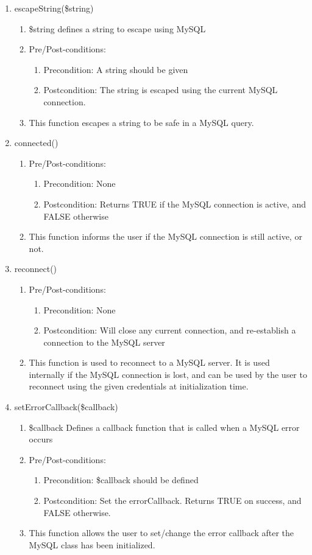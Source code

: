 \documentclass{article}
\begin{document}
\begin{enumerate}
\begin{enumerate}
\end{enumerate}
\item escapeString(\$string)
\begin{enumerate}
\item \$string defines a string to escape using MySQL
\item Pre/Post-conditions:
\begin{enumerate}
\item Precondition: A string should be given
\item Postcondition: The string is escaped using the current MySQL connection.
\end{enumerate}
\item This function escapes a string to be safe in a MySQL query.
\end{enumerate}
\item connected()
\begin{enumerate}
\item Pre/Post-conditions:
\begin{enumerate}
\item Precondition: None
\item Postcondition: Returns TRUE if the MySQL connection is active, and FALSE otherwise
\end{enumerate}
\item This function informs the user if the MySQL connection is still active, or not.
\end{enumerate}
\item reconnect()
\begin{enumerate}
\item Pre/Post-conditions:
\begin{enumerate}
\item Precondition: None
\item Postcondition: Will close any current connection, and re-establish a connection to the MySQL server
\end{enumerate}
\item This function is used to reconnect to a MySQL server. It is used internally if the MySQL connection is lost, and can be used by the user to reconnect using the given credentials at initialization time.
\end{enumerate}
\item setErrorCallback(\$callback)
\begin{enumerate}
\item \$callback  Defines a callback function that is called when a MySQL error occurs
\item Pre/Post-conditions:
\begin{enumerate}
\item Precondition: \$callback should be defined
\item Postcondition: Set the errorCallback. Returns TRUE on success, and FALSE otherwise.
\end{enumerate}
\item This function allows the user to set/change the error callback after the MySQL class has been initialized.
\end{enumerate}
\end{enumerate}
\end{document}
